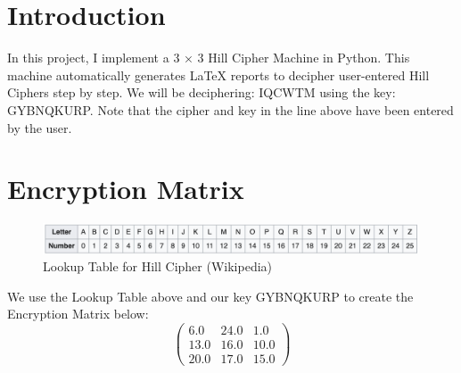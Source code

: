 \documentclass{article}%
\begin{document}
%
\normalsize%
\section{Introduction}%
\label{sec:Introduction}%
In this project, I implement a 3  ×  3 Hill Cipher Machine in Python. This machine automatically generates LaTeX reports to decipher user{-}entered Hill Ciphers step by step. \newline%
 \newline%
%
We will be deciphering: IQCWTM using the key: GYBNQKURP. \newline%
 \newline%
%
Note that the cipher and key in the line above have been entered by the user.

%
\section{Encryption Matrix}%
\label{sec:EncryptionMatrix}%


\begin{figure}[h!]%
\centering%
\includegraphics[width=420px]{./LookupHill.png}%
\caption{Lookup Table for Hill Cipher (Wikipedia)}%
\end{figure}

%
We use the Lookup Table above and our key GYBNQKURP to create the Encryption Matrix below: \newline%
%
\[%
\begin{pmatrix}%
6.0&24.0&1.0\\%
13.0&16.0&10.0\\%
20.0&17.0&15.0%
\end{pmatrix}%
\]

%
\end{document}
